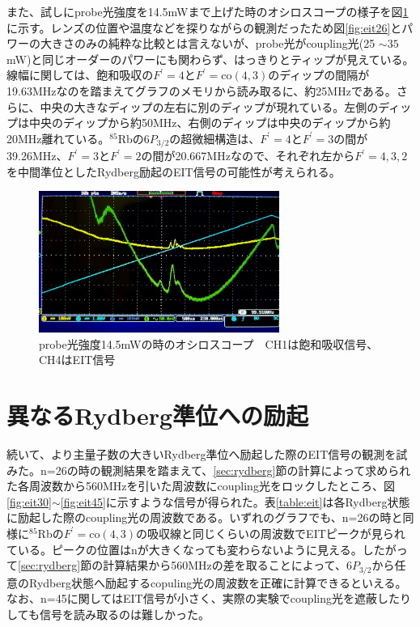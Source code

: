 \documentclass[dvipdfmx]{jsreport}
\begin{document}
また、試しにprobe光強度を14.5mWまで上げた時のオシロスコープの様子を図\ref{fig:eit-high}に示す。レンズの位置や温度などを探りながらの観測だったため図\ref{fig:eit26}とパワーの大きさのみの純粋な比較とは言えないが、probe光がcoupling光(25 $\sim 35$mW)と同じオーダーのパワーにも関わらず、はっきりとティップが見えている。線幅に関しては、飽和吸収の$F^{'} = 4$と$F^{'} = \text{co}(4,3)$のディップの間隔が19.63MHzなのを踏まえてグラフのメモリから読み取るに、約25MHzである。さらに、中央の大きなディップの左右に別のディップが現れている。左側のディップは中央のディップから約50MHz、右側のディップは中央のディップから約20MHz離れている。$^{85}$Rbの$6P_{3/2}$の超微細構造は、$F^{'} = 4$と$F^{'} = 3$の間が39.26MHz、$F^{'} = 3$と$F^{'} = 2$の間が20.667MHzなので\cite{hyperfine}、それぞれ左から$F^{'} = 4,3,2$を中間準位としたRydberg励起のEIT信号の可能性が考えられる。
\begin{figure}[hbtp]
\centering
\includegraphics[width=0.7\textwidth]{images/eit_high.jpg}
\caption{\label{fig:eit-high}probe光強度14.5mWの時のオシロスコープ　CH1は飽和吸収信号、CH4はEIT信号}
\end{figure}

\section{異なるRydberg準位への励起}
続いて、より主量子数の大きいRydberg準位へ励起した際のEIT信号の観測を試みた。n=26の時の観測結果を踏まえて、\ref{sec:rydberg}節の計算によって求められた各周波数から560MHzを引いた周波数にcoupling光をロックしたところ、図\ref{fig:eit30}$\sim$\ref{fig:eit45}に示すような信号が得られた。表\ref{table:eit}は各Rydberg状態に励起した際のcoupling光の周波数である。いずれのグラフでも、n=26の時と同様に$^{85}$Rbの$F^{'} = \text{co}(4,3)$の吸収線と同じくらいの周波数でEITピークが見られている。ピークの位置はnが大きくなっても変わらないように見える。したがって\ref{sec:rydberg}節の計算結果から560MHzの差を取ることによって、$6P_{3/2}$から任意のRydberg状態へ励起するcopuling光の周波数を正確に計算できるといえる。なお、n=45に関してはEIT信号が小さく、実際の実験でcoupling光を遮蔽したりしても信号を読み取るのは難しかった。
\end{document}
